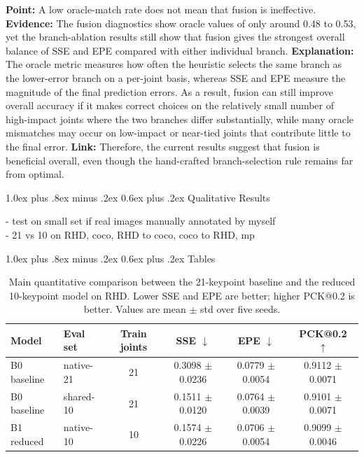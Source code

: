 \documentclass[10pt,letterpaper]{article}
\makeatletter
\renewcommand\subsection{\@startsection{subsection}{2}{\z@}%
  {1.0ex plus .8ex minus .2ex}%
  {0.6ex plus .2ex}%
  {\normalfont\itshape}}
\makeatother
\begin{document}
\noindent\textbf{Point:} A low oracle-match rate does not mean that fusion is ineffective.
\textbf{Evidence:} The fusion diagnostics show oracle values of only around 0.48 to 0.53, yet the branch-ablation results still show that fusion gives the strongest overall balance of SSE and EPE compared with either individual branch.
\textbf{Explanation:} The oracle metric measures how often the heuristic selects the same branch as the lower-error branch on a per-joint basis, whereas SSE and EPE measure the magnitude of the final prediction errors. As a result, fusion can still improve overall accuracy if it makes correct choices on the relatively small number of high-impact joints where the two branches differ substantially, while many oracle mismatches may occur on low-impact or near-tied joints that contribute little to the final error.
\textbf{Link:} Therefore, the current results suggest that fusion is beneficial overall, even though the hand-crafted branch-selection rule remains far from optimal.



\subsection{Qualitative Results}

- test on small set if real images manually annotated by myself\\
- 21 vs 10 on RHD, coco, RHD to coco, coco to RHD, mp

\subsection{Tables}

\begin{table}[H]
\centering
\footnotesize
\caption{Main quantitative comparison between the 21-keypoint baseline and the reduced 10-keypoint model on RHD. Lower SSE and EPE are better; higher PCK@0.2 is better. Values are mean $\pm$ std over five seeds.}
\label{tab:main_accuracy}
\begin{tabular}{llcccc}
\toprule
Model & Eval set & Train joints & SSE $\downarrow$ & EPE $\downarrow$ & PCK@0.2 $\uparrow$ \\
\midrule
B0 baseline & native-21 & 21 & 0.3098 $\pm$ 0.0236 & 0.0779 $\pm$ 0.0054 & 0.9112 $\pm$ 0.0071 \\
B0 baseline & shared-10 & 21 & 0.1511 $\pm$ 0.0120 & 0.0764 $\pm$ 0.0039 & 0.9101 $\pm$ 0.0071 \\
B1 reduced & native-10 & 10 & 0.1574 $\pm$ 0.0226 & 0.0706 $\pm$ 0.0054 & 0.9099 $\pm$ 0.0046 \\
\bottomrule
\end{tabular}
\end{table}
\end{document}
